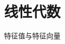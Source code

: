 \documentclass[9pt,notheorems]{beamer}
\begin{document}
\title{线性代数}
\subtitle{特征值与特征向量}


\begin{frame}[plain]\transboxout
\titlepage
\end{frame}

\begin{frame}[allowframebreaks]\transboxin
\begin{center}
\tableofcontents[hideallsubsections]
\end{center}
\end{frame}







% 
\end{document}
